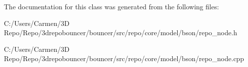 The documentation for this class was generated from the following files\+:\begin{DoxyCompactItemize}
\item 
C\+:/\+Users/\+Carmen/3\+D Repo/\+Repo/3drepobouncer/bouncer/src/repo/core/model/bson/repo\+\_\+node.\+h\item 
C\+:/\+Users/\+Carmen/3\+D Repo/\+Repo/3drepobouncer/bouncer/src/repo/core/model/bson/repo\+\_\+node.\+cpp\end{DoxyCompactItemize}
